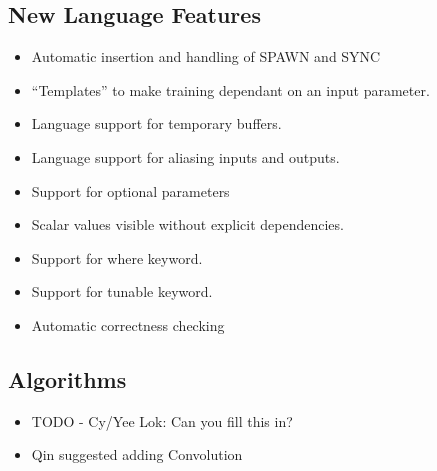 \documentclass[11pt]{article}
\begin{document}
\subsection{New Language Features}
\begin{itemize}

\item Automatic insertion and handling of SPAWN and SYNC

\item ``Templates'' to make training dependant on an input parameter.

\item Language support for temporary buffers.

\item Language support for aliasing inputs and outputs.

\item Support for optional parameters

\item Scalar values visible without explicit dependencies.

\item Support for where keyword.

\item Support for tunable keyword.

\item Automatic correctness checking

\end{itemize}

\subsection{Algorithms}
\begin{itemize}

\item TODO - Cy/Yee Lok: Can you fill this in?

\item Qin suggested adding Convolution

\end{itemize}
\end{document}
